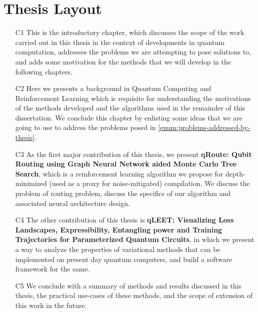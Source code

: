 \section{Thesis Layout}

\begin{itemize}
    \item[C1] This is the introductory chapter, which discusses the scope of the work carried out in this thesis in the context of developments in quantum computation, addresses the problems we are attempting to pose solutions to, and adds some motivation for the methods that we will develop in the following chapters.
    \item[C2] Here we presents a background in Quantum Computing and Reinforcement Learning which is requisite for understanding the motivations of the methods developed and the algorithms used in the remainder of this dissertation. We conclude this chapter by enlisting some ideas that we are going to use to address the problems posed in \ref{enum:problems-addressed-by-thesis}.
    \item[C3] As the first major contribution of this thesis, we present \textbf{qRoute: Qubit Routing using Graph Neural Network aided Monte Carlo Tree Search}, which is a reinforcement learning algorithm we propose for depth-minimized (used as a proxy for noise-mitigated) compilation. We discuss the problem of routing problem, discuss the specifics of our algorithm and associated neural architecture design.
    \item[C4] The other contribution of this thesis is \textbf{qLEET: Visualizing Loss Landscapes, Expressibility, Entangling power and Training Trajectories for Parameterized Quantum Circuits}, in which we present a way to analyze the properties of variational methods that can be implemented on present day quantum computers, and build a software framework for the same.
    \item[C5] We conclude with a summary of methods and results discussed in this thesis, the practical use-cases of these methods, and the scope of extension of this work in the future.
\end{itemize}

